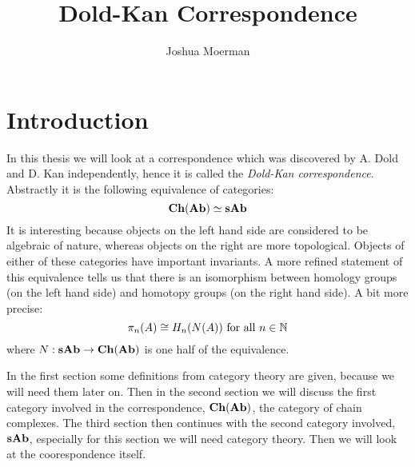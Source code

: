 \documentclass[12pt]{amsproc}
\title{Dold-Kan Correspondence}
\author{Joshua Moerman}
\theoremstyle{plain}
\theoremstyle{definition}
\begin{document}
\maketitle

\section*{Introduction}
In this thesis we will look at a correspondence which was discovered by A. Dold and D. Kan independently, hence it is called the \emph{Dold-Kan correspondence}. Abstractly it is the following equivalence of categories:
$$ \mathbf{Ch}(\mathbf{Ab}) \simeq \mathbf{sAb} $$
It is interesting because objects on the left hand side are considered to be algebraic of nature, whereas objects on the right are more topological. Objects of either of these categories have important invariants. A more refined statement of this equivalence tells us that there is an isomorphism between homology groups (on the left hand side) and homotopy groups (on the right hand side). A bit more precise:
$$ \pi_n(A) \cong H_n(N(A)) \text{ for all } n \in \mathbb{N} $$
where $N: \mathbf{sAb} \to \mathbf{Ch}(\mathbf{Ab})$ is one half of the equivalence.

In the first section some definitions from category theory are given, because we will need them later on. Then in the second section we will discuss the first category involved in the correspondence, $\mathbf{Ch}(\mathbf{Ab})$, the category of chain complexes. The third section then continues with the second category involved, $\mathbf{sAb}$, especially for this section we will need category theory. Then we will look at the coorespondence itself.

\newpage


\newpage


\newpage


\newpage


\newpage


\newpage
{}

\newpage
\listoftodos
% 
% 	
\end{document}

